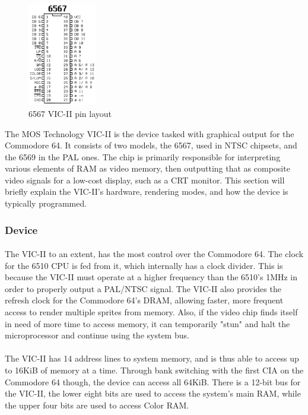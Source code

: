 \documentclass{article}
\begin{document}
\paragraph{}
\begin{figure}
\vspace{-20pt}
\begin{center}
\includegraphics[width=3cm]{6567}
\caption{6567 VIC-II pin layout}
\end{center}
\end{figure}
The MOS Technology VIC-II is the device tasked with graphical output for the Commodore 64. It consists of two models, the 6567, used in NTSC chipsets, and the 6569 in the PAL ones. The chip is primarily responsible for interpreting various elements of RAM as video memory, then outputting that as composite video signals for a low-cost display, such as a CRT monitor. This section will briefly explain the VIC-II's hardware, rendering modes, and how the device is typically programmed.

\subsubsection{Device}
\paragraph{}
The VIC-II to an extent, has the most control over the Commodore 64. The clock for the 6510 CPU is fed from it, which internally has a clock divider. This is because the VIC-II must operate at a higher frequency than the 6510's 1MHz in order to properly output a PAL/NTSC signal. The VIC-II also provides the refresh clock for the Commodore 64's DRAM, allowing faster, more frequent access to render multiple sprites from memory. Also, if the video chip finds itself in need of more time to access memory, it can temporarily "stun" and halt the microprocessor and continue using the system bus. 

\paragraph{}
The VIC-II has 14 address lines to system memory, and is thus able to access up to 16KiB of memory at a time. Through bank switching with the first CIA on the Commodore 64 though, the device can access all 64KiB. There is a 12-bit bus for the VIC-II, the lower eight bits are used to access the system's main RAM, while the upper four bits are used to access Color RAM. 
\end{document}
